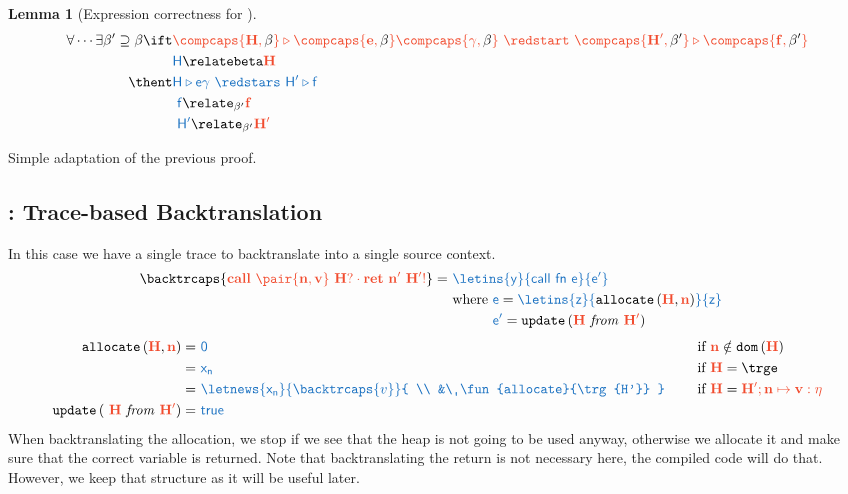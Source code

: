 \documentclass{article}
\newtheorem{lemma}[theorem]{Lemma}
\theoremstyle{definition}
\begin{document}
\begin{lemma}[Expression correctness for \compcaps{\cdot}]\label{thm:expr-corr-caps}
	\begin{align*}
		\forall \cdots  \exists \beta'\supseteq\beta 
		\ift
		&
		\trg{\compcaps{H,\com{\beta}}\triangleright \compcaps{e,\com{\beta}}\compcaps{\gamma,\com{\beta}}\ \redstart\ \compcaps{H',\com{\beta'}}\triangleright\compcaps{f,\com{\beta'}}}
		\\
		&
		\src{H}\relatebeta\trg{H}
		\\
		\thent&
		\src{H\triangleright e\gamma\ \redstars\ H'\triangleright f}
		\\
		&\
		\src{f}\relate_{\beta'}\trg{f}
		\\
		&\
		\src{H'}\relate_{\beta'}\trg{H'}
	\end{align*}
\end{lemma}
Simple adaptation of the previous proof.



\subsection{\backtrcaps{\cdot}: Trace-based Backtranslation}
In this case we have a single trace to backtranslate into a single source context.
\begin{align*}
	\backtrcaps{ \trg{\trg{call~\pair{n,v}~H?} \cdot \trg{ret~n'~H'!}} } =
		&\
		\src{\letins{y}{call~fn~e}{e'}}
		\\
		&\
		\begin{aligned}[t]
			\text{where }
			&
			\src{e}=
				\src{
					\begin{aligned}[t]
						&
						\letins{
							\src{z}
						}{
							\fun{allocate}{\trg{H}, \trg{n}}
						}{
							\src{z}	
						}
					\end{aligned}
				}
			\\
			&
			\src{e'} = \fun{update}{\trg{H}~\com{from}~\trg{H'}}
		\end{aligned}
\end{align*}
\begin{align*}
	\fun{allocate}{\trg{H}, \trg{n}}
		=
		&\
		\src{0} 
		&&
			\text{ if }\trg{n}\notin\dom{\trg{H}}
	\\  
		=
		&\
		\src{x_n} 
		&&
			\text{ if }\trg{H}=\trge
	\\  
		=
		&\
			\src{
				\begin{aligned}[t]
					&
					\letnews{
						\src{x_n}
					}{
						\backtrcaps{v}
					}{
					\\
					&\
						\fun{allocate}{\trg{H'}} 
					}	
				\end{aligned}
			}
		&&
			\text{ if }\trg{H}=\trg{H';n\mapsto v:\eta}
	\\
	\fun{update}{~\trg{H}~\com{from}~\trg{H'}} =
		&\
		\src{true}
\end{align*}
When backtranslating the allocation, we stop if we see that the heap is not going to be used anyway, otherwise we allocate it and make sure that the correct variable is returned.
Note that backtranslating the return is not necessary here, the compiled code will do that.
However, we keep that structure as it will be useful later.
\end{document}
